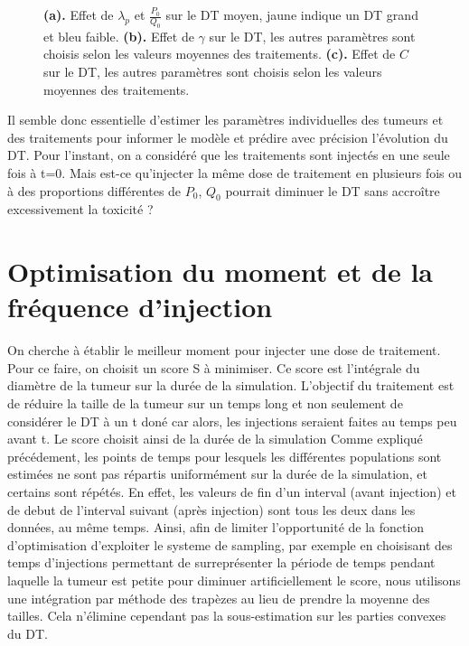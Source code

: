 \documentclass[12pt,a4paper]{article}
\begin{document}
\begin{figure}
\begin{subfigure}[t]{0.45\textwidth}
        \caption{} \label{fig:effet_C}
    \end{subfigure}

    \caption{\textbf{(a).} Effet de $\lambda_{p}$ et $\frac{P_{0}}{Q_{0}}$ sur le DT moyen, jaune indique un DT grand et bleu faible. \textbf{(b).} Effet de $\gamma$ sur le DT, les autres paramètres sont choisis selon les valeurs moyennes des traitements. \textbf{(c).} Effet de $C$ sur le DT, les autres paramètres sont choisis selon les valeurs moyennes des traitements.}

\end{figure}
Il semble donc essentielle d'estimer les paramètres individuelles des tumeurs et des traitements pour informer le modèle et prédire avec précision l'évolution du DT. 
Pour l'instant, on a considéré que les traitements sont injectés en une seule fois à t=0.  Mais est-ce qu'injecter la même dose de traitement en plusieurs fois ou à des proportions différentes de $P_{0}$, $Q_{0}$ pourrait diminuer le DT sans accroître excessivement la toxicité ? 
\section{Optimisation du moment et de la fréquence d'injection}
On cherche à établir le meilleur moment pour injecter une dose de traitement. Pour ce faire, on choisit un score S à minimiser. Ce score est l'intégrale du diamètre de la tumeur sur la durée de la simulation. L'objectif du traitement est de réduire la taille de la tumeur sur un temps long et non seulement de considérer le DT à un t doné car alors, les injections seraient faites au temps peu avant t. Le score choisit ainsi de la durée de la simulation
Comme expliqué précédement, les points de temps pour lesquels les différentes populations sont estimées ne sont pas répartis uniformément sur la durée de la simulation, et certains sont répétés. En effet, les valeurs de fin d'un interval (avant injection) et de debut de l'interval suivant (après injection) sont tous les deux dans les données, au même temps. Ainsi, afin de limiter l'opportunité de la fonction d'optimisation d'exploiter le systeme de sampling, par exemple en choisisant des temps d'injections permettant de surreprésenter la période de temps pendant laquelle la tumeur est petite pour diminuer artificiellement le score, nous utilisons une intégration par méthode des trapèzes au lieu de prendre la moyenne des tailles. Cela n'élimine cependant pas la sous-estimation sur les parties convexes du \ac{DT}.
\end{document}

